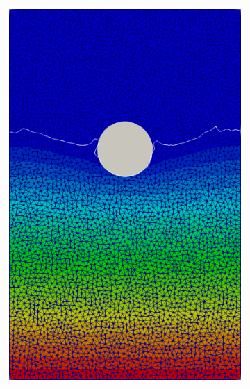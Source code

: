 \begin{figure}[H]
\begin{subfigure}{0.38\columnwidth}
		\includegraphics[width=1.0\textwidth]{images/FSI_Comparison/CD_FEM.png}
	\end{subfigure}
	\begin{subfigure}{0.15\columnwidth}    
		\centering

\end{subfigure}
\end{figure}
